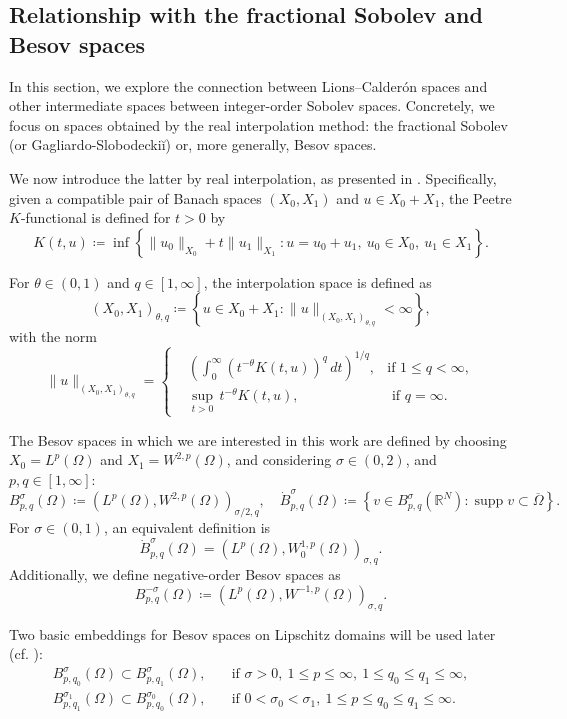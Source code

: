 \documentclass[]{amsart}
\theoremstyle{definition}
\theoremstyle{definition}
\theoremstyle{remark}
\numberwithin{equation}{section}
\begin{document}
\subsection{Relationship with the fractional Sobolev and Besov spaces}
In this section, we explore the connection between Lions–Calderón spaces and other intermediate spaces between integer-order Sobolev spaces. Concretely, we focus on spaces obtained by the real interpolation method: the fractional Sobolev (or Gagliardo-Slobodeckiĭ) or, 
more generally, Besov spaces.

        
	We now introduce the latter by real interpolation, as presented in \cite[Chapter~22]{tartar2007introduction}.
    Specifically, given a compatible pair of Banach spaces \( (X_0, X_1) \) and \( u \in X_0 + X_1 \), the Peetre \( K \)-functional is defined for \( t > 0 \) by
	\[
	K(t, u) \coloneq \inf \left\{  \|u_0\|_{X_0} + t\|u_1\|_{X_1}  : u = u_0 + u_1,\ u_0 \in X_0,\ u_1 \in X_1 \right\}.
	\]  
	
	For \( \theta \in (0,1) \) and \( q \in [1, \infty] \), the interpolation space is defined as  
	\[
	(X_0, X_1)_{\theta, q} \coloneq \left\{ u \in X_0 + X_1 : \|u\|_{(X_0, X_1)_{\theta, q}} < \infty \right\},
	\]  
	with the norm  
	\[
	\|u\|_{(X_0, X_1)_{\theta, q}} =
    	\left\{
	\begin{aligned}
		&\left(  \int_{0}^{\infty} (t^{-\theta} K(t,u))^{q}\, dt \right)^{1/q},  &\text{if } 1 \leq q < \infty, \\
		&\sup_{t > 0} \, t^{-\theta} K(t,u), &\text{ if  } q = \infty.
	\end{aligned}
    \right.
	\]  
	
	The Besov spaces in which we are interested in this work are defined by choosing \( X_0 = L^p(\Omega) \) and \( X_1 = W^{2,p}(\Omega) \), and considering \( \sigma \in (0,2) \), and \( p, q \in [1, \infty] \):
	\[
	B_{p, q}^{\sigma}(\Omega)  \coloneq \left(L^{p}(\Omega), W^{2,p}(\Omega)\right)_{\sigma / 2, q}, \quad
	\dot{B}_{p, q}^{\sigma}(\Omega)\coloneq \left\{ v \in B_{p, q}^{\sigma}(\mathbb{R}^{N}) : \operatorname{supp} v \subset \overline{\Omega} \right\}.
	\]
	For \( \sigma \in (0,1) \), an equivalent definition is  
	\[
	\dot{B}_{p, q}^{\sigma}(\Omega) = \left(L^{p}(\Omega), 
    W^{1,p}_0
    (\Omega)\right)_{\sigma, q}.
	\]  
    	Additionally, we define negative-order Besov spaces as 
	\[
	B_{p, q}^{-\sigma}(\Omega) \coloneq \left(L^{p}(\Omega), W^{-1,p}(\Omega)\right)_{\sigma, q}.
	\]  
	
	Two basic embeddings for Besov spaces on Lipschitz domains will be used later (cf. \cite[sections 3.2.4 and 3.3.1]             {triebel2010theory}): 
    \begin{align}
        B_{p, q_0}^{\sigma}(\Omega) \subset B_{p, q_1}^{\sigma}(\Omega), & \quad \text{if } \sigma > 0,\ 1 \leq p \leq \infty,\ 1 \leq q_0 \leq q_1 \leq \infty, \\ \label{eq: embedding besov}
		B_{p, q_1}^{\sigma_1}(\Omega) \subset B_{p, q_0}^{\sigma_0}(\Omega), & \quad \text{if } 0 < \sigma_0 < \sigma_1,\ 1 \leq p \leq q_0 \leq q_1 \leq \infty.
    \end{align}
	
\end{document}
